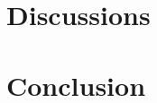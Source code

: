 \documentclass[12pt]{article}
\begin{document}
\section{Discussions}\label{Discussions}

\section{Conclusion}\label{Conclusions}










\end{document}
